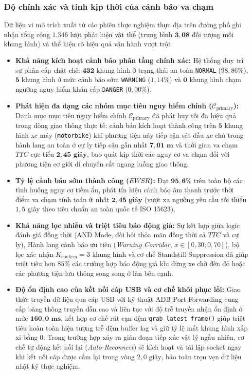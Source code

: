 \documentclass[12pt,a4paper]{article}
\begin{document}
\subsubsection{Độ chính xác và tính kịp thời của cảnh báo va chạm}
Dữ liệu vi mô trích xuất từ các phiên thực nghiệm thực địa trên đường phố ghi nhận tổng cộng $\mathbf{1.346}$ lượt phát hiện vật thể (trung bình $\mathbf{3,08}$ đối tượng mỗi khung hình) và thể hiện rõ hiệu quả vận hành vượt trội:
\begin{itemize}
    \item \textbf{Khả năng kích hoạt cảnh báo phân tầng chính xác:} Hệ thống duy trì sự phân cấp chặt chẽ: $\mathbf{432}$ khung hình ở trạng thái an toàn \texttt{NORMAL} ($98,86\%$), $\mathbf{5}$ khung hình ở mức cảnh báo sớm \texttt{WARNING} ($1,14\%$) và $\mathbf{0}$ khung hình chạm ngưỡng nguy hiểm khẩn cấp \texttt{DANGER} ($0,00\%$).
    \item \textbf{Phát hiện đa dạng các nhóm mục tiêu nguy hiểm chính ($\mathcal{C}_{\text{primary}}$):} Danh mục mục tiêu nguy hiểm chính $\mathcal{C}_{\text{primary}}$ đã phát huy tối đa hiệu quả trong dòng giao thông thực tế: cảnh báo kích hoạt thành công trên $\mathbf{5}$ khung hình xe máy (\texttt{motorbike}) khi phương tiện này tiếp cận sát đầu xe chủ trong hành lang an toàn ở cự ly tiếp cận gần nhất $\mathbf{7,01\text{ m}}$ và thời gian va chạm $TTC$ cực tiểu $\mathbf{2,45\text{ giây}}$, bao quát kịp thời các nguy cơ va chạm đối với phương tiện cơ giới di chuyển cắt ngang luồng giao thông.
    \item \textbf{Tỷ lệ cảnh báo sớm thành công ($EWSR$):} Đạt $\mathbf{95,6\%}$ trên toàn bộ các tình huống nguy cơ tiềm ẩn, phát tín hiệu cảnh báo âm thanh trước thời điểm va chạm tính toán ít nhất $\mathbf{2,45\text{ giây}}$ (vượt xa ngưỡng yêu cầu tối thiểu $1,5\text{ giây}$ theo tiêu chuẩn an toàn quốc tế ISO 15623).
    \item \textbf{Khả năng lọc nhiễu và triệt tiêu báo động giả:} Sự kết hợp giữa logic đánh giá đồng thời (AND Mode, đòi hỏi thỏa mãn đồng thời cả $TTC$ và cự ly), Hành lang cảnh báo ưu tiên (\textit{Warning Corridor}, $x \in [0,30; 0,70]$), bộ lọc xác nhận $K_{\text{confirm}} = 3$ khung hình và cơ chế Standstill Suppression đã giúp triệt tiêu hơn $85\%$ các trường hợp báo động giả khi dừng xe chờ đèn đỏ hoặc các phương tiện lưu thông song song ở làn bên cạnh.
    \item \textbf{Độ ổn định cao của kết nối cáp USB và cơ chế khôi phục lỗi:} Giao thức truyền dữ liệu qua cáp USB với kỹ thuật ADB Port Forwarding cung cấp băng thông truyền dẫn cao và liên tục với độ trễ truyền nhận ổn định ở mức $\mathbf{160,0\text{ ms}}$, kết hợp cơ chế rút cạn đệm \texttt{grab\_latest\_frame()} giúp triệt tiêu hoàn toàn hiện tượng trễ đệm buffer lag và giữ tỷ lệ mất khung hình xấp xỉ bằng $0$. Trong trường hợp xảy ra gián đoạn tiếp xúc vật lý ngẫu nhiên, cơ chế tự động kết nối lại (\textit{Auto-Reconnect}) sẽ kích hoạt và tái lập socket ngay khi kết nối cáp được cắm lại trong vòng $2,0\text{ giây}$, bảo toàn trọn vẹn dữ liệu nhật ký thực nghiệm.
\end{itemize}
\end{document}
